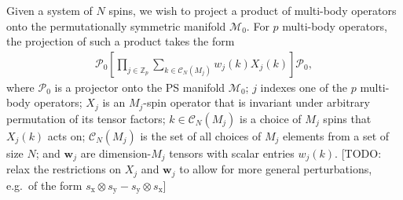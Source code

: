 \documentclass[nofootinbib,notitlepage,11pt]{revtex4-2}
\newcommand{\p}[1]{\left(#1\right)} %
\renewcommand{\sp}[1]{\left[#1\right]} %
\newcommand{\m}{\bm} %
\newcommand{\1}{\mathds{1}}
\newcommand{\x}{\text{x}}
\newcommand{\y}{\text{y}}
\newcommand{\C}{\mathcal{C}}
\newcommand{\M}{\mathcal{M}}
\renewcommand{\P}{\mathcal{P}}
\newcommand{\ZZ}{\mathbb{Z}}
\newcommand{\red}[1]{{\color{red} #1}}
\begin{document}
Given a system of $N$ spins, we wish to project a product of
multi-body operators onto the permutationally symmetric manifold
$\M_0$.  For $p$ multi-body operators, the projection of such a
product takes the form
\begin{align}
  \P_0 \sp{\prod_{j\in\ZZ_p}
    \sum_{k\in\C_N\p{M_j}} w_j\p{k} X_j\p{k}} \P_0,
  \label{eq:sym_prod_proj}
\end{align}
where $\P_0$ is a projector onto the PS manifold $\M_0$; $j$ indexes
one of the $p$ multi-body operators; $X_j$ is an $M_j$-spin operator
that is invariant under arbitrary permutation of its tensor factors;
$k\in\C_N\p{M_j}$ is a choice of $M_j$ spins that $X_j\p{k}$ acts on;
$\C_N\p{M_j}$ is the set of all choices of $M_j$ elements from a set
of size $N$; and $\m w_j$ are dimension-$M_j$ tensors with scalar
entries $w_j\p{k}$. \red{[TODO: relax the restrictions on $X_j$ and
  $\m w_j$ to allow for more general perturbations, e.g.~of the form
  $s_\x\otimes s_\y-s_\y\otimes s_\x$]}
\end{document}
